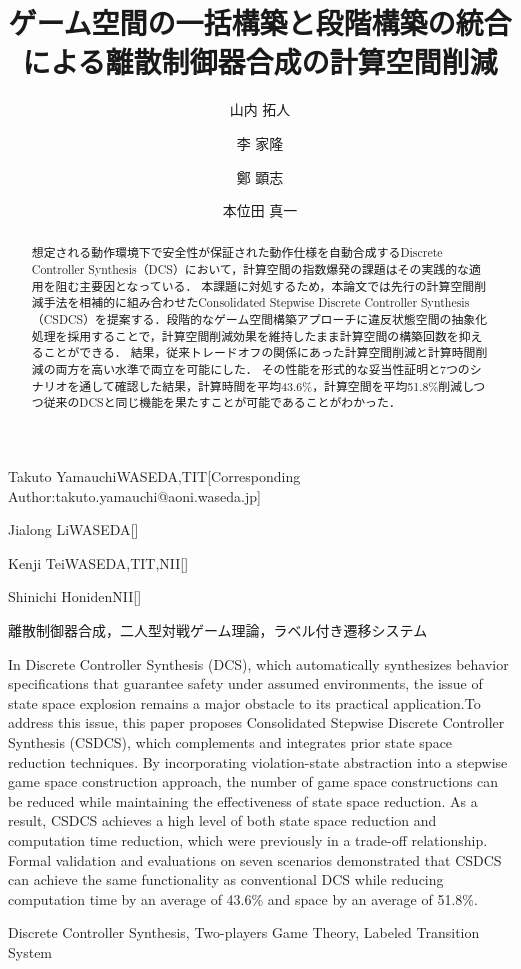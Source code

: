 \documentclass[submit]{ipsj}
\begin{document}
\title{ゲーム空間の一括構築と段階構築の統合による離散制御器合成の計算空間削減}



\author{山内 拓人}{Takuto Yamauchi}{WASEDA,TIT}[Corresponding Author:takuto.yamauchi@aoni.waseda.jp]
\author{李 家隆}{Jialong Li}{WASEDA}[]
\author{鄭 顕志}{Kenji Tei}{WASEDA,TIT,NII}[]
\author{本位田 真一}{Shinichi Honiden}{NII}[]

\begin{abstract}
想定される動作環境下で安全性が保証された動作仕様を自動合成するDiscrete Controller Synthesis（DCS）において，計算空間の指数爆発の課題はその実践的な適用を阻む主要因となっている．
本課題に対処するため，本論文では先行の計算空間削減手法を相補的に組み合わせたConsolidated Stepwise Discrete Controller Synthesis（CSDCS）を提案する．段階的なゲーム空間構築アプローチに違反状態空間の抽象化処理を採用することで，計算空間削減効果を維持したまま計算空間の構築回数を抑えることができる．
結果，従来トレードオフの関係にあった計算空間削減と計算時間削減の両方を高い水準で両立を可能にした．
その性能を形式的な妥当性証明と7つのシナリオを通して確認した結果，計算時間を平均43.6\%，計算空間を平均51.8\%削減しつつ従来のDCSと同じ機能を果たすことが可能であることがわかった．
\end{abstract}
\begin{jkeyword}
離散制御器合成，二人型対戦ゲーム理論，ラベル付き遷移システム
\end{jkeyword}


\begin{eabstract}
In Discrete Controller Synthesis (DCS), which automatically synthesizes behavior specifications that guarantee safety under assumed environments, the issue of state space explosion remains a major obstacle to its practical application.To address this issue, this paper proposes Consolidated Stepwise Discrete Controller Synthesis (CSDCS), which complements and integrates prior state space reduction techniques. By incorporating violation-state abstraction into a stepwise game space construction approach, the number of game space constructions can be reduced while maintaining the effectiveness of state space reduction. As a result, CSDCS achieves a high level of both state space reduction and computation time reduction, which were previously in a trade-off relationship. Formal validation and evaluations on seven scenarios demonstrated that CSDCS can achieve the same functionality as conventional DCS while reducing computation time by an average of 43.6\% and space by an average of 51.8\%.
\end{eabstract}
\begin{ekeyword}
Discrete Controller Synthesis, Two-players Game Theory, Labeled Transition System
\end{ekeyword}
\end{document}
